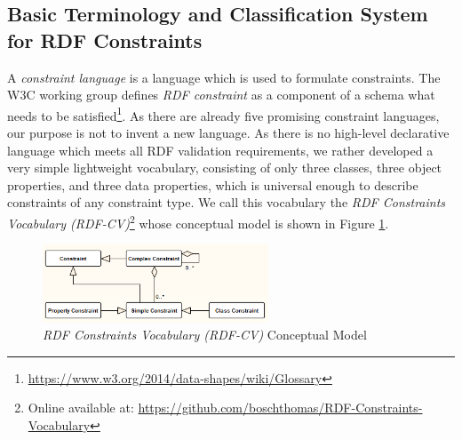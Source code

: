 \documentclass[a4paper,fontsize=11pt]{scrartcl}
\begin{document}
\subsection{Basic Terminology and Classification System for RDF Constraints}

A \emph{constraint language} is a language which is used to formulate constraints.
The W3C working group defines \emph{RDF constraint} as a component of a schema what needs to be satisfied\footnote{\url{https://www.w3.org/2014/data-shapes/wiki/Glossary}}.
As there are already five promising constraint languages, 
our purpose is not to invent a new language.
As there is no high-level declarative language which meets all RDF validation requirements,
we rather developed a very simple lightweight vocabulary,
consisting of only three classes, three object properties, and three data properties, 
which is universal enough to describe constraints of any constraint type.
We call this vocabulary the \emph{RDF Constraints Vocabulary (RDF-CV)}\footnote{Online available at: \url{https://github.com/boschthomas/RDF-Constraints-Vocabulary}} whose conceptual model is shown in Figure \ref{fig:RDF-CV-conceptual-model}.
\begin{figure}[H]
	\centering
		\includegraphics[width=0.60\textwidth]{images/RDF-CV-conceptual-model.png}
	\caption{\emph{RDF Constraints Vocabulary (RDF-CV)} Conceptual Model}
	\label{fig:RDF-CV-conceptual-model}
\end{figure}
\end{document}
